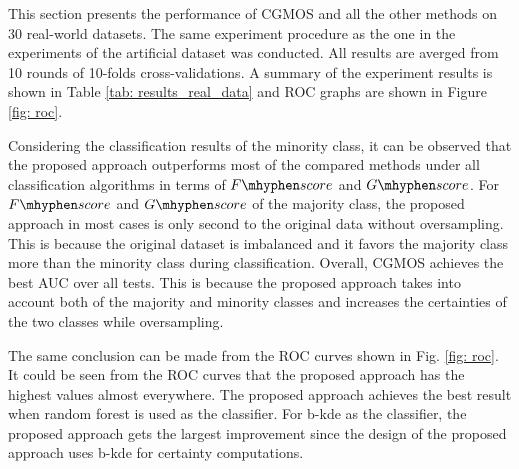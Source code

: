 \documentclass{iitthesis}
\newcommand\fscore{\mathop{F\mhyphen score}}
\newcommand\gscore{\mathop{G\mhyphen score}}
\begin{document}
This section presents the performance of CGMOS and all the other methods on 30 real-world datasets. The same experiment procedure as the one in the experiments of the artificial dataset was conducted. All results are averged from 10 rounds of 10-folds cross-validations. A summary of the experiment results is shown in Table \ref{tab: results_real_data} and ROC graphs are shown in Figure \ref{fig: roc}.

\begin{table}[ht]
\caption{A summary of $p$-values of statistical significant tests of classification results using CGMOS against each of all the other competitors. }
\begin{center}
\end{center}
\label{tab: signrank}
\end{table}

Considering the classification results of the minority class, it can be observed that the proposed approach outperforms most of the compared methods under all classification algorithms in terms of $\fscore$ and $\gscore$. For $\fscore$ and $\gscore$ of the majority class, the proposed approach in most cases is only second to the original data without oversampling. This is because the original dataset is imbalanced and it favors the majority class more than the minority class during classification. Overall, CGMOS achieves the best AUC over all tests. This is because the proposed approach takes into account both of the majority and minority classes and increases the certainties of the two classes while oversampling.

The same conclusion can be made from the ROC curves shown in Fig. \ref{fig: roc}. It could be seen from the ROC curves that the proposed approach has the highest values almost everywhere. The proposed approach achieves the best result when random forest is used as the classifier. For b-kde as the classifier, the proposed approach gets the largest improvement
since the design of the proposed approach uses b-kde for certainty computations.
\end{document}
